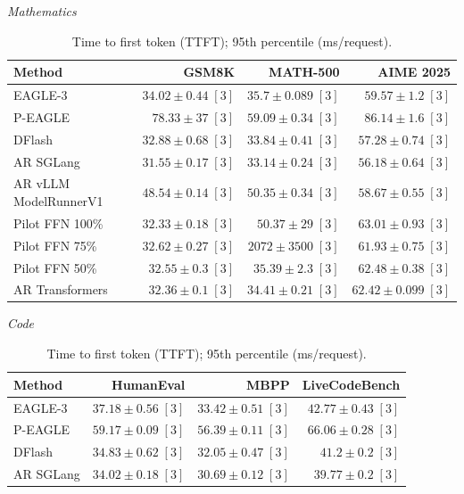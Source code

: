 \begin{table}[!htp]
\centering\small
\setlength{\tabcolsep}{3pt}
\caption{Time to first token (TTFT); 95th percentile (ms/request).}
\label{tab:appendix-metric-ttft-95th-percentile-none}
\textit{Mathematics}\par\smallskip
\begin{tabular}{@{}>{\raggedright\arraybackslash}p{3.7cm}rrr@{}}
\toprule
Method & GSM8K & MATH-500 & AIME 2025 \\
\midrule
EAGLE-3 & \(34.02 \pm 0.44\;[3]\) & \(35.7 \pm 0.089\;[3]\) & \(59.57 \pm 1.2\;[3]\) \\
P-EAGLE & \(78.33 \pm 37\;[3]\) & \(59.09 \pm 0.34\;[3]\) & \(86.14 \pm 1.6\;[3]\) \\
DFlash & \(32.88 \pm 0.68\;[3]\) & \(33.84 \pm 0.41\;[3]\) & \(57.28 \pm 0.74\;[3]\) \\
AR \textperiodcentered{} SGLang & \(\mathbf{31.55} \pm 0.17\;[3]\) & \(\mathbf{33.14} \pm 0.24\;[3]\) & \(\mathbf{56.18} \pm 0.64\;[3]\) \\
AR \textperiodcentered{} vLLM ModelRunnerV1 & \(48.54 \pm 0.14\;[3]\) & \(50.35 \pm 0.34\;[3]\) & \(58.67 \pm 0.55\;[3]\) \\
Pilot FFN 100\% & \(32.33 \pm 0.18\;[3]\) & \(50.37 \pm 29\;[3]\) & \(63.01 \pm 0.93\;[3]\) \\
Pilot FFN 75\% & \(32.62 \pm 0.27\;[3]\) & \(2072 \pm 3500\;[3]\) & \(61.93 \pm 0.75\;[3]\) \\
Pilot FFN 50\% & \(32.55 \pm 0.3\;[3]\) & \(35.39 \pm 2.3\;[3]\) & \(62.48 \pm 0.38\;[3]\) \\
AR \textperiodcentered{} Transformers & \(32.36 \pm 0.1\;[3]\) & \(34.41 \pm 0.21\;[3]\) & \(62.42 \pm 0.099\;[3]\) \\
\bottomrule
\end{tabular}\par\medskip
\textit{Code}\par\smallskip
\begin{tabular}{@{}>{\raggedright\arraybackslash}p{3.7cm}rrr@{}}
\toprule
Method & HumanEval & MBPP & LiveCodeBench \\
\midrule
EAGLE-3 & \(37.18 \pm 0.56\;[3]\) & \(33.42 \pm 0.51\;[3]\) & \(42.77 \pm 0.43\;[3]\) \\
P-EAGLE & \(59.17 \pm 0.09\;[3]\) & \(56.39 \pm 0.11\;[3]\) & \(66.06 \pm 0.28\;[3]\) \\
DFlash & \(34.83 \pm 0.62\;[3]\) & \(32.05 \pm 0.47\;[3]\) & \(41.2 \pm 0.2\;[3]\) \\
AR \textperiodcentered{} SGLang & \(\mathbf{34.02} \pm 0.18\;[3]\) & \(\mathbf{30.69} \pm 0.12\;[3]\) & \(\mathbf{39.77} \pm 0.2\;[3]\) \\

\end{tabular}
\end{table}
